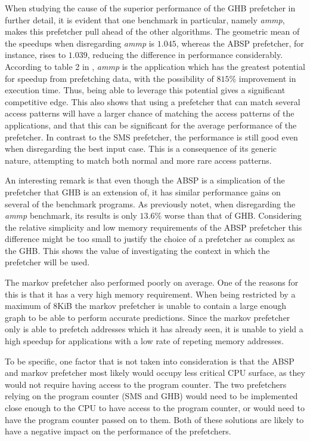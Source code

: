 When studying the cause of the superior performance of the GHB
prefetcher in further detail, it is evident that one benchmark in
particular, namely \emph{ammp}, makes this prefetcher pull ahead of the other
algorithms. The geometric mean of the speedups when disregarding \emph{ammp}
is $1.045$, whereas the ABSP prefetcher, for instance, rises to
$1.039$, reducing the difference in performance
considerably. According to table 2 in \cite{Nesbit}, \emph{ammp} is the
application which has the greatest potential for speedup from
prefetching data, with the possibility of $815\%$ improvement in
execution time. Thus, being able to leverage this potential gives a
significant competitive edge. This also shows that using a prefetcher that can match several access patterns will have a larger chance of matching the access patterns of the applications, and that this can be significant for the average performance of the prefetcher. In contrast to the SMS prefetcher, the performance is still good even when disregarding the best input case. This is a consequence of its generic nature, attempting to match both normal and more rare access patterns.   

An interesting remark is that even though the ABSP is a simplication
of the prefetcher that GHB is an extension of, it has similar
performance gains on several of the benchmark programs. As previously notet, when disregarding the \emph{ammp} benchmark, its results is only $13.6\%$ worse than that of GHB. Considering the relative simplicity and low memory requirements of the ABSP prefetcher this difference might be too small to justify the choice of a prefetcher as complex as the GHB. This shows the value of investigating the context in which the prefetcher will be used.  

The markov prefetcher also performed poorly on average. One of the reasons for this is that it has a very high memory requirement. When being restricted by a maximum of 8KiB the markov prefetcher is unable to contain a large enough graph to be able to perform accurate predictions. Since the markov prefetcher only is able to prefetch addresses which it has already seen, it is unable to yield a high speedup for applications with a low rate of repeting memory addresses.

To be specific, one factor that is not taken into consideration is that the ABSP and markov prefetcher most likely would occupy less critical CPU surface, as they would not require having access to the program counter. The two prefetchers relying on the program counter (SMS and GHB) would need to be implemented close enough to the CPU to have access to the program counter, or would need to have the program counter passed on to them. Both of these solutions are likely to have a negative impact on the performance of the prefetchers. 
